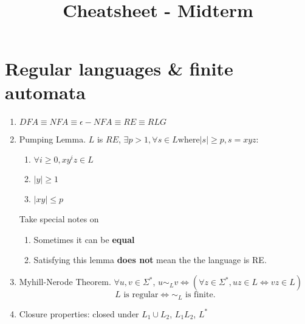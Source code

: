 \documentclass{article}
\title{
    \vspace{-0.8in}
    \textmd{\textbf{\class \\ Cheatsheet - Midterm}}\\
}
\author{\authorName}
\date{}
\newcommand{\U}{\Sigma^*}
\begin{document}
\maketitle

\begin{comment}
\setcounter{section}{-1}
\section{Introduction}\begin{enumerate}
	\item Proof ideas are important? Too lazy to list them out...
\end{enumerate}
\end{comment}


\section{Regular languages \& finite automata}\begin{enumerate}
	\item $DFA \equiv NFA \equiv \epsilon-NFA \equiv RE \equiv RLG$
	\item Pumping Lemma. $L$ is $RE$, $\exists p > 1, \forall s \in L \text{where} |s| \ge p, s = xyz$:
	\begin{enumerate}
		\item $\forall i \ge 0, xy^iz \in L$
		\item $|y| \ge 1$
		\item $|xy| \le p$
	\end{enumerate}
	Take special notes on
	\begin{enumerate}
		\item Sometimes it can be \textbf{equal}
		\item Satisfying this lemma \textbf{does not} mean the the language is RE.
	\end{enumerate} 
	\item Myhill-Nerode Theorem. $\forall u, v\in \U$, $u \sim_L v \Longleftrightarrow (\forall z \in \U, uz \in L \Leftrightarrow vz \in L)$ \\
	$$L \text{ is regular} \Longleftrightarrow \sim_L \text{ is finite.} $$
	\item Closure properties: closed under $L_1 \cup L_2$, $L_1L_2$, $L^*$
\end{enumerate}
\end{document}
